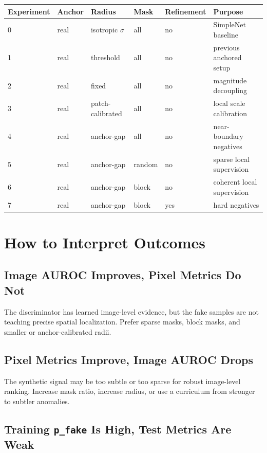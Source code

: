 \documentclass[11pt]{article}
\newcommand{\code}[1]{\texttt{#1}}
\begin{document}
\begin{center}
\begin{tabular}{llllll}
\toprule
Experiment & Anchor & Radius & Mask & Refinement & Purpose \\
\midrule
0 & real & isotropic $\sigma$ & all & no & SimpleNet baseline \\
1 & real & threshold & all & no & previous anchored setup \\
2 & real & fixed & all & no & magnitude decoupling \\
3 & real & patch-calibrated & all & no & local scale calibration \\
4 & real & anchor-gap & all & no & near-boundary negatives \\
5 & real & anchor-gap & random & no & sparse local supervision \\
6 & real & anchor-gap & block & no & coherent local supervision \\
7 & real & anchor-gap & block & yes & hard negatives \\
\bottomrule
\end{tabular}
\end{center}

\section{How to Interpret Outcomes}

\subsection{Image AUROC Improves, Pixel Metrics Do Not}

The discriminator has learned image-level evidence, but the fake samples are not
teaching precise spatial localization. Prefer sparse masks, block masks, and
smaller or anchor-calibrated radii.

\subsection{Pixel Metrics Improve, Image AUROC Drops}

The synthetic signal may be too subtle or too sparse for robust image-level
ranking. Increase mask ratio, increase radius, or use a curriculum from stronger
to subtler anomalies.

\subsection{Training \code{p\_fake} Is High, Test Metrics Are Weak}
\end{document}
